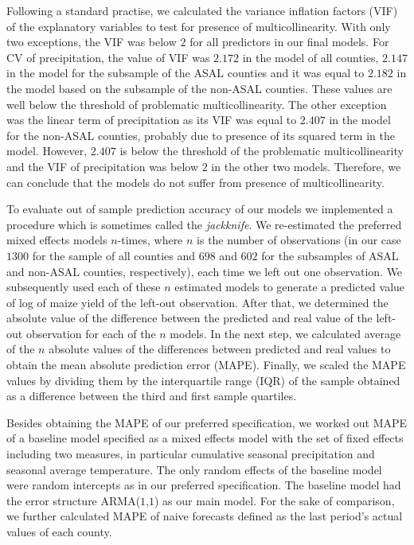 \documentclass[12pt]{iopart}
\begin{document}
Following a standard practise, we calculated the variance inflation factors (VIF) of the explanatory variables to test for presence of multicollinearity. With only two exceptions, the VIF was below $2$ for all predictors in our final models. For CV of precipitation, the value of VIF was $2.172$ in the model of all counties, $2.147$ in the model for the subsample of the ASAL counties and it was equal to $2.182$ in the model based on the subsample of the non-ASAL counties. These values are well below the threshold of problematic multicollinearity. The other exception was the linear term of precipitation as its VIF was equal to $2.407$ in the model for the non-ASAL counties, probably due to presence of its squared term in the model. However, $2.407$ is below the threshold of the problematic multicollinearity and the VIF of precipitation was below $2$ in the other two models. Therefore, we can conclude that the models do not suffer from presence of multicollinearity.

To evaluate out of sample prediction accuracy of our models we implemented a procedure which is sometimes called the \textit{jackknife}. We re-estimated the preferred mixed effects models $n$-times, where $n$ is the number of observations (in our case $1300$ for the sample of all counties and $698$ and $602$ for the subsamples of ASAL and non-ASAL counties, respectively), each time we left out one observation. We subsequently used each of these $n$ estimated models to generate a predicted value 
of log of maize yield of the left-out observation. After that, we determined the absolute value of the difference between the predicted and real value of the left-out observation for each of the $n$ models. In the next step, we calculated average of the $n$ absolute values of the differences between predicted and real values to obtain the mean absolute prediction error (MAPE). Finally, we scaled the MAPE values by dividing them by the interquartile range (IQR) of the sample obtained as a difference between the third and first sample quartiles.


Besides obtaining the MAPE of our preferred specification, we worked out MAPE of a baseline model specified as a mixed effects model with the set of fixed effects including two measures, in particular cumulative seasonal precipitation and seasonal average temperature. The only random effects of the baseline model were random intercepts as in our preferred specification. The baseline model had the error structure ARMA($1$,$1$) as our main model. For the sake of comparison, we further calculated MAPE of naive forecasts defined as the last period's actual values of each county.
\end{document}
